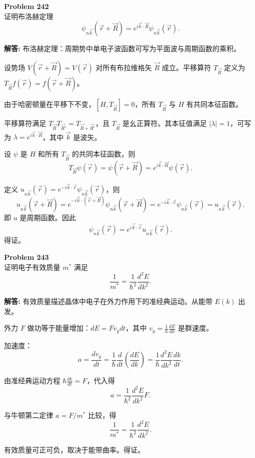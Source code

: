 \documentclass[12pt, a4paper, oneside]{ctexart}
\newenvironment{solution}{\par\noindent\textbf{解答:}\quad}{\par}
\begin{document}
\begin{mdframed}[backgroundcolor=gray!10, linewidth=0pt]
    \textbf{Problem 242} \\
    证明布洛赫定理
    \[
    \psi_{n\vec{k}}(\vec{r} + \vec{R}) = e^{i \vec{k} \cdot \vec{R}} \psi_{n\vec{k}}(\vec{r}).
    \]
\end{mdframed}
\begin{solution}
    布洛赫定理：周期势中单电子波函数可写为平面波与周期函数的乘积。
    
    设势场 $V(\vec{r} + \vec{R}) = V(\vec{r})$ 对所有布拉维格矢 $\vec{R}$ 成立。平移算符 $T_{\vec{R}}$ 定义为 $T_{\vec{R}} f(\vec{r}) = f(\vec{r} + \vec{R})$。
    
    由于哈密顿量在平移下不变，$[H, T_{\vec{R}}] = 0$，所有 $T_{\vec{R}}$ 与 $H$ 有共同本征函数。
    
    平移算符满足 $T_{\vec{R}} T_{\vec{R}'} = T_{\vec{R}+\vec{R}'}$，且 $T_{\vec{R}}$ 是幺正算符。其本征值满足 $|\lambda| = 1$，可写为 $\lambda = e^{i \vec{k} \cdot \vec{R}}$，其中 $\vec{k}$ 是波矢。
    
    设 $\psi$ 是 $H$ 和所有 $T_{\vec{R}}$ 的共同本征函数，则
    \[
    T_{\vec{R}} \psi(\vec{r}) = \psi(\vec{r} + \vec{R}) = e^{i \vec{k} \cdot \vec{R}} \psi(\vec{r}).
    \]
    
    定义 $u_{n\vec{k}}(\vec{r}) = e^{-i \vec{k} \cdot \vec{r}} \psi_{n\vec{k}}(\vec{r})$，则
    \[
    u_{n\vec{k}}(\vec{r} + \vec{R}) = e^{-i \vec{k} \cdot (\vec{r}+\vec{R})} \psi_{n\vec{k}}(\vec{r}+\vec{R}) = e^{-i \vec{k} \cdot \vec{r}} \psi_{n\vec{k}}(\vec{r}) = u_{n\vec{k}}(\vec{r}).
    \]
    即 $u$ 是周期函数。因此
    \[
    \psi_{n\vec{k}}(\vec{r}) = e^{i \vec{k} \cdot \vec{r}} u_{n\vec{k}}(\vec{r}).
    \]
    得证。
\end{solution}

\begin{mdframed}[backgroundcolor=gray!10, linewidth=0pt]
    \textbf{Problem 243} \\
    证明电子有效质量 $m^*$ 满足
    \[
    \frac{1}{m^*} = \frac{1}{\hbar^2} \frac{d^2 E}{d k^2}.
    \]
\end{mdframed}
\begin{solution}
    有效质量描述晶体中电子在外力作用下的准经典运动。从能带 $E(k)$ 出发。
    
    外力 $F$ 做功等于能量增加：$dE = F v_g dt$，其中 $v_g = \frac{1}{\hbar} \frac{dE}{dk}$ 是群速度。
    
    加速度：
    \[
    a = \frac{d v_g}{dt} = \frac{1}{\hbar} \frac{d}{dt} \left( \frac{dE}{dk} \right) = \frac{1}{\hbar} \frac{d^2 E}{dk^2} \frac{dk}{dt}.
    \]
    
    由准经典运动方程 $\hbar \frac{dk}{dt} = F$，代入得
    \[
    a = \frac{1}{\hbar^2} \frac{d^2 E}{dk^2} F.
    \]
    
    与牛顿第二定律 $a = F/m^*$ 比较，得
    \[
    \frac{1}{m^*} = \frac{1}{\hbar^2} \frac{d^2 E}{dk^2}.
    \]
    
    有效质量可正可负，取决于能带曲率。得证。
\end{solution}
\end{document}
